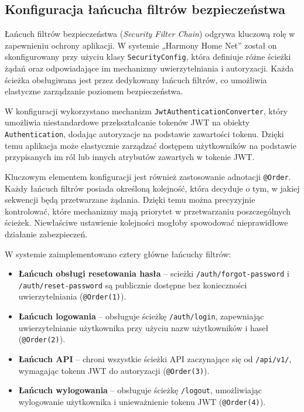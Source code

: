 \subsection{Konfiguracja łańcucha filtrów bezpieczeństwa}

Łańcuch filtrów bezpieczeństwa (\emph{Security Filter Chain}) odgrywa kluczową rolę w zapewnieniu ochrony aplikacji. W systemie „Harmony Home Net” został on skonfigurowany przy użyciu klasy \texttt{SecurityConfig}, która definiuje różne ścieżki żądań oraz odpowiadające im mechanizmy uwierzytelniania i autoryzacji. Każda ścieżka obsługiwana jest przez dedykowany łańcuch filtrów, co umożliwia elastyczne zarządzanie poziomem bezpieczeństwa.

W konfiguracji wykorzystano mechanizm \texttt{JwtAuthenticationConverter}, który umożliwia niestandardowe przekształcanie tokenów JWT na obiekty \texttt{Authentication}, dodając autoryzacje na podstawie zawartości tokenu. Dzięki temu aplikacja może elastycznie zarządzać dostępem użytkowników na podstawie przypisanych im ról lub innych atrybutów zawartych w tokenie JWT.

Kluczowym elementem konfiguracji jest również zastosowanie adnotacji \texttt{@Order}. Każdy łańcuch filtrów posiada określoną kolejność, która decyduje o tym, w jakiej sekwencji będą przetwarzane żądania. Dzięki temu można precyzyjnie kontrolować, które mechanizmy mają priorytet w przetwarzaniu poszczególnych ścieżek. Niewłaściwe ustawienie kolejności mogłoby spowodować nieprawidłowe działanie zabezpieczeń.

W systemie zaimplementowano cztery główne łańcuchy filtrów:
\begin{itemize}
    \item \textbf{Łańcuch obsługi resetowania hasła} -- scieżki \texttt{/auth/forgot-password} i \texttt{/auth/reset-password} są publicznie dostępne bez konieczności uwierzytelniania (\texttt{@Order(1)}).
    \item \textbf{Łańcuch logowania} -- obsługuje ścieżkę \texttt{/auth/login}, zapewniając uwierzytelnianie użytkownika przy użyciu nazw użytkowników i haseł (\texttt{@Order(2)}).
    \item \textbf{Łańcuch API} -- chroni wszystkie ścieżki API zaczynające się od \texttt{/api/v1/}, wymagając tokenu JWT do autoryzacji (\texttt{@Order(3)}).
    \item \textbf{Łańcuch wylogowania} -- obsługuje ścieżkę \texttt{/logout}, umożliwiając wylogowanie użytkownika i unieważnienie tokenu JWT (\texttt{@Order(4)}).
\end{itemize}

